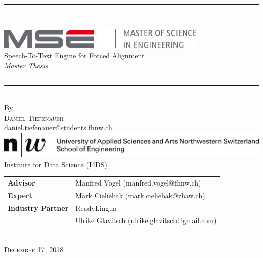 \begin{titlepage}
\vspace*{13mm}
\begin{center}
	\rule[0.5ex]{\linewidth}{2pt}\vspace*{-\baselineskip}\vspace*{3.2pt}
	\rule[0.5ex]{\linewidth}{1pt}\\[\baselineskip]
	\includegraphics[scale=0.4]{./img/mse_logo.jpg}\\[4mm]
	{\huge Speech-To-Text Engine for Forced Alignment }\\[4mm]
	{\Large \textit{Master Thesis}}\\
	\rule[0.5ex]{\linewidth}{1pt}\vspace*{-\baselineskip}\vspace{3.2pt}
	\rule[0.5ex]{\linewidth}{2pt}\\
	\vspace{6.5mm}
	{\large By}\\
	\vspace{6.5mm}
	{\large\textsc{Daniel Tiefenauer}}\\
	daniel.tiefenauer@students.fhnw.ch\\
	\vspace{11mm}
	\includegraphics{./img/fhnw_logo.jpg} \\
	\vspace{6mm}
	{\large Institute for Data Science (I4DS)}\\
	\vspace{11mm}
	\begin{minipage}{10cm}
		\begin{tabular}{ll}
			\textbf{Advisor} & Manfred Vogel (manfred.vogel@fhnw.ch) \\
			\textbf{Expert} & Mark Cieliebak (mark.cieliebak@zhaw.ch) \\
			\textbf{Industry Partner} & ReadyLingua \\
 			& Ulrike Glavitsch (ulrike.glavitsch@gmail.com)
		\end{tabular}
	\end{minipage}\\
	\vspace{9mm}
	{\large\textsc{December 17, 2018}}
	\vspace{12mm}
\end{center}
\end{titlepage}